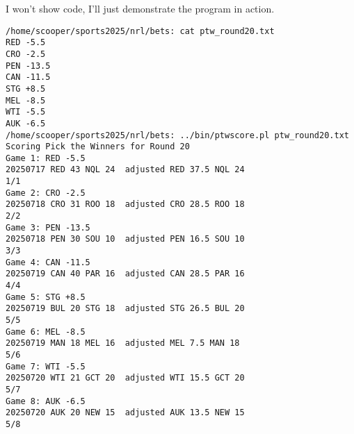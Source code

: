 \documentclass{article}      %
\begin{document}
I won't show code, I'll just demonstrate the program in action.

\begin{verbatim}
/home/scooper/sports2025/nrl/bets: cat ptw_round20.txt
RED -5.5
CRO -2.5
PEN -13.5
CAN -11.5
STG +8.5
MEL -8.5
WTI -5.5
AUK -6.5
/home/scooper/sports2025/nrl/bets: ../bin/ptwscore.pl ptw_round20.txt
Scoring Pick the Winners for Round 20
Game 1: RED -5.5
20250717 RED 43 NQL 24  adjusted RED 37.5 NQL 24
1/1
Game 2: CRO -2.5
20250718 CRO 31 ROO 18  adjusted CRO 28.5 ROO 18
2/2
Game 3: PEN -13.5
20250718 PEN 30 SOU 10  adjusted PEN 16.5 SOU 10
3/3
Game 4: CAN -11.5
20250719 CAN 40 PAR 16  adjusted CAN 28.5 PAR 16
4/4
Game 5: STG +8.5
20250719 BUL 20 STG 18  adjusted STG 26.5 BUL 20
5/5
Game 6: MEL -8.5
20250719 MAN 18 MEL 16  adjusted MEL 7.5 MAN 18
5/6
Game 7: WTI -5.5
20250720 WTI 21 GCT 20  adjusted WTI 15.5 GCT 20
5/7
Game 8: AUK -6.5
20250720 AUK 20 NEW 15  adjusted AUK 13.5 NEW 15
5/8
\end{verbatim}
\end{document}
